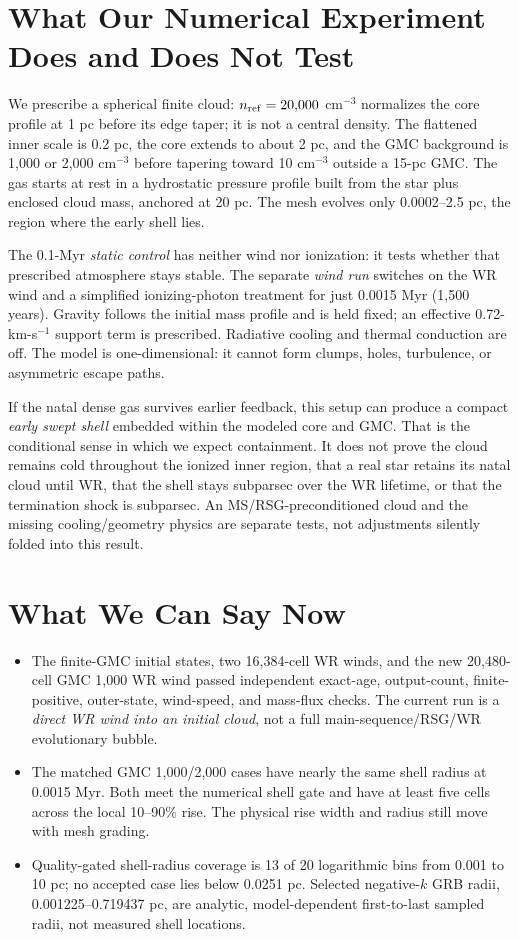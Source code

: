 \documentclass[10pt,letterpaper]{article}
\begin{document}
\section{What Our Numerical Experiment Does and Does Not Test}
We prescribe a spherical finite cloud: $n_{\rm ref}=20{,}000$ cm$^{-3}$ normalizes the core profile at 1 pc before its edge taper; it is not a central density. The flattened inner scale is 0.2 pc, the core extends to about 2 pc, and the GMC background is 1,000 or 2,000 cm$^{-3}$ before tapering toward 10 cm$^{-3}$ outside a 15-pc GMC. The gas starts at rest in a hydrostatic pressure profile built from the star plus enclosed cloud mass, anchored at 20 pc. The mesh evolves only 0.0002--2.5 pc, the region where the early shell lies.

The 0.1-Myr \emph{static control} has neither wind nor ionization: it tests whether that prescribed atmosphere stays stable. The separate \emph{wind run} switches on the WR wind and a simplified ionizing-photon treatment for just 0.0015 Myr (1,500 years). Gravity follows the initial mass profile and is held fixed; an effective 0.72-km-s$^{-1}$ support term is prescribed. Radiative cooling and thermal conduction are off. The model is one-dimensional: it cannot form clumps, holes, turbulence, or asymmetric escape paths.

If the natal dense gas survives earlier feedback, this setup can produce a compact \emph{early swept shell} embedded within the modeled core and GMC. That is the conditional sense in which we expect containment. It does not prove the cloud remains cold throughout the ionized inner region, that a real star retains its natal cloud until WR, that the shell stays subparsec over the WR lifetime, or that the termination shock is subparsec. An MS/RSG-preconditioned cloud and the missing cooling/geometry physics are separate tests, not adjustments silently folded into this result.

\clearpage
\section{What We Can Say Now}
\begin{itemize}
\item The finite-GMC initial states, two 16,384-cell WR winds, and the new 20,480-cell GMC 1,000 WR wind passed independent exact-age, output-count, finite-positive, outer-state, wind-speed, and mass-flux checks. The current run is a \emph{direct WR wind into an initial cloud}, not a full main-sequence/RSG/WR evolutionary bubble.
\item The matched GMC 1,000/2,000 cases have nearly the same shell radius at 0.0015 Myr. Both meet the numerical shell gate and have at least five cells across the local 10--90\% rise. The physical rise width and radius still move with mesh grading.
\item Quality-gated shell-radius coverage is 13 of 20 logarithmic bins from 0.001 to 10 pc; no accepted case lies below 0.0251 pc. Selected negative-$k$ GRB radii, 0.001225--0.719437 pc, are analytic, model-dependent first-to-last sampled radii, not measured shell locations.
\end{itemize}
\end{document}
